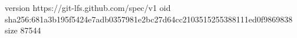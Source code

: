 version https://git-lfs.github.com/spec/v1
oid sha256:681a3b195f5424e7adb0357981e2bc27d64cc2103515255388111ed0f9869838
size 87544
